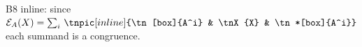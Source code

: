 \documentclass[varwidth=16cm, border=6pt]{standalone}
\begin{document}
B8 inline: since
$\mathcal{E}_A(X)=\sum_{i}\,\tnpic[inline]{\tn[box]{A^i} & \tnX{X} & \tn*[box]{A^i}}$
each summand is a congruence.
\end{document}
